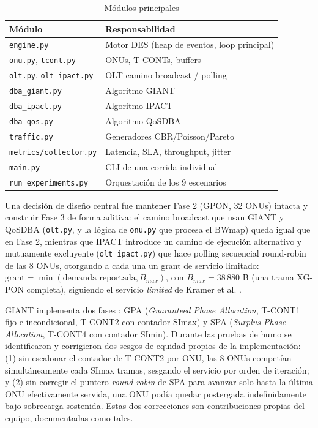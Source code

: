 \documentclass[conference]{IEEEtran}
\begin{document}
\begin{table}[h]
\centering
\caption{Módulos principales}
\label{tab:modulos}
\footnotesize
\begin{tabular}{p{3.2cm}p{4.0cm}}
\toprule
Módulo & Responsabilidad \\
\midrule
\texttt{engine.py} & Motor DES (heap de eventos, loop principal) \\
\texttt{onu.py}, \texttt{tcont.py} & ONUs, T-CONTs, buffers \\
\texttt{olt.py}, \texttt{olt\_ipact.py} & OLT camino broadcast / polling \\
\texttt{dba\_giant.py} & Algoritmo GIANT \\
\texttt{dba\_ipact.py} & Algoritmo IPACT \\
\texttt{dba\_qos.py} & Algoritmo QoSDBA \\
\texttt{traffic.py} & Generadores CBR/Poisson/Pareto \\
\texttt{metrics/collector.py} & Latencia, SLA, throughput, jitter \\
\texttt{main.py} & CLI de una corrida individual \\
\texttt{run\_experiments.py} & Orquestación de los 9 escenarios \\
\bottomrule
\end{tabular}
\end{table}

Una decisión de diseño central fue mantener Fase 2 (GPON, 32 ONUs)
intacta y construir Fase 3 de forma aditiva: el camino broadcast que usan
GIANT y QoSDBA (\texttt{olt.py}, y la lógica de \texttt{onu.py} que
procesa el BWmap) queda igual que en Fase 2, mientras que IPACT introduce
un camino de
ejecución alternativo y mutuamente excluyente (\texttt{olt\_ipact.py})
que hace polling secuencial round-robin de las 8 ONUs, otorgando a cada
una un grant de servicio limitado: $\text{grant} = \min(\text{demanda
reportada}, B_{max})$, con $B_{max}=38\,880$ B (una trama XG-PON
completa), siguiendo el servicio \emph{limited} de Kramer et al.
\cite{kramer2002}.

GIANT implementa dos fases \cite{giant}: GPA (\emph{Guaranteed Phase
Allocation}, T-CONT1 fijo e incondicional, T-CONT2 con contador SImax) y
SPA (\emph{Surplus Phase Allocation}, T-CONT4 con contador SImin). Durante
las pruebas de humo se identificaron y corrigieron dos sesgos de equidad
propios de la implementación: (1) sin escalonar el contador de T-CONT2
por ONU, las 8 ONUs competían simultáneamente cada SImax tramas,
sesgando el servicio por orden de iteración; y (2) sin corregir el
puntero \emph{round-robin} de SPA para avanzar solo hasta la última ONU
efectivamente servida, una ONU podía quedar postergada indefinidamente
bajo sobrecarga sostenida. Estas dos correcciones son contribuciones
propias del equipo, documentadas como tales.
\end{document}
